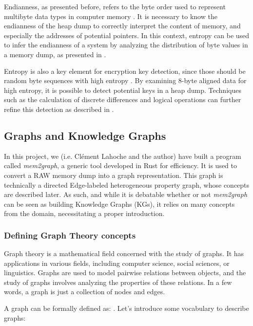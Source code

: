     Endianness, as presented before, refers to the byte order used to represent multibyte data types in computer memory \cite{InferenceEndianness17}. It is necessary to know the endianness of the heap dump to correctly interpret the content of memory, and especially the addresses of potential pointers. In this context, entropy can be used to infer the endianness of a system by analyzing the distribution of byte values in a memory dump, as presented in  \cite{InferenceEndianness17}.

    Entropy is also a key element for encryption key detection, since those should be random byte sequences with high entropy \cite{SmartKex22}. By examining 8-byte aligned data for high entropy, it is possible to detect potential keys in a heap dump. Techniques such as the calculation of discrete differences and logical operations can further refine this detection as described in  \cite{SmartKex22}.

    \subsection{Graphs and Knowledge Graphs}
    In this project, we (i.e. Clément Lahoche and the author) have built a program called \textit{mem2graph}, a generic tool developed in Rust for efficiency. It is used to convert a RAW memory dump into a graph representation. This graph is technically a directed Edge-labeled heterogeneous property graph, whose concepts are described later. As such, and while it is debatable whether or not \textit{mem2graph} can be seen as building Knowledge Graphs (KGs), it relies on many concepts from the domain, necessitating a proper introduction.

    \subsubsection{Defining Graph Theory concepts}
    Graph theory is a mathematical field concerned with the study of graphs. It has applications in various fields, including computer science, social sciences, or linguistics. Graphs are used to model pairwise relations between objects, and the study of graphs involves analyzing the properties of these relations. In a few words, a graph is just a collection of nodes and edges.
    
    A graph can be formally defined  as:  \cite{GraphTheorySolnon}. Let's introduce some vocabulary to describe graphs:

